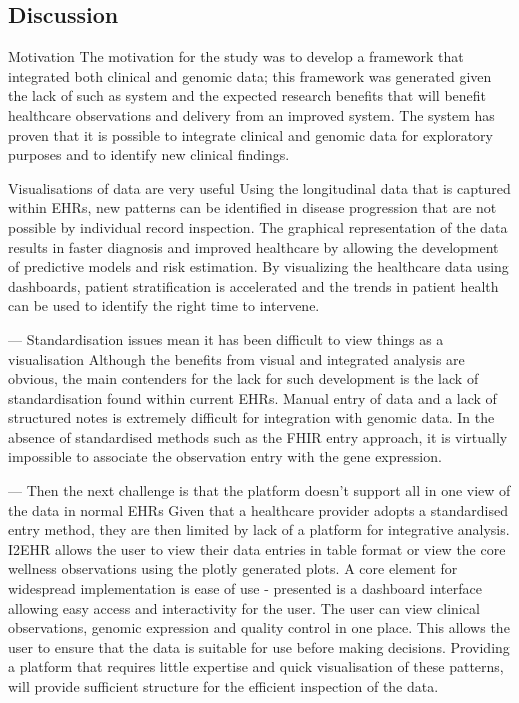 \documentclass{bioinfo}
\begin{document}
\begin{Discussion}

\section{Discussion}
\enlargethispage{6pt}
Motivation
The motivation for the study was to develop a framework that integrated both clinical and genomic data; this framework was generated given the lack of such as system and the expected research benefits that will benefit healthcare observations and delivery from an improved system. The system has proven that it is possible to integrate clinical and genomic data for exploratory purposes and to identify new clinical findings.

Visualisations of data are very useful 
Using the longitudinal data that is captured within EHRs, new patterns can be identified in disease progression that are not possible by individual record inspection. The graphical representation of the data results in faster diagnosis and improved healthcare by allowing the development of predictive models and risk estimation. By visualizing the healthcare data using dashboards, patient stratification is accelerated and the trends in patient health can be used to identify the right time to intervene. 

--- Standardisation issues mean it has been difficult to view things as a visualisation 
Although the benefits from visual and integrated analysis are obvious, the main contenders for the lack for such development is the lack of standardisation found within current EHRs. Manual entry of data and a lack of structured notes is extremely difficult for integration with genomic data. In the absence of standardised methods such as the FHIR entry approach, it is virtually impossible to associate the observation entry with the gene expression. 

--- Then the next challenge is that the platform doesn’t support all in one view of the data in normal EHRs
Given that a healthcare provider adopts a standardised entry method, they are then limited by lack of a platform for integrative analysis. I2EHR allows the user to view their data entries in table format or view the core wellness observations using the plotly generated plots. A core element for widespread implementation is ease of use - presented is a dashboard interface allowing easy access and interactivity for the user. 
The user can view clinical observations, genomic expression and quality control in one place. This allows the user to ensure that the data is suitable for use before making decisions. Providing a platform that requires little expertise and quick visualisation of these patterns, will provide sufficient structure for the efficient inspection of the data.


\end{Discussion}
\end{document}
